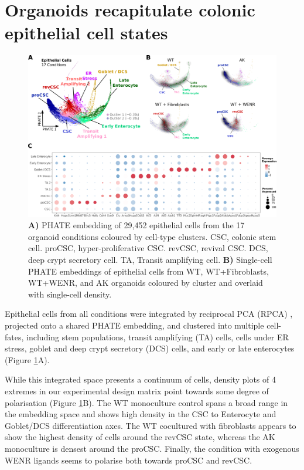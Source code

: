 \section{Organoids recapitulate colonic epithelial cell states}

\begin{figure}[H]
    \centering
    \includegraphics{04seq/figs/4SEQ_INTctrl.png}
    \caption{\textbf{A)} PHATE embedding of 29,452 epithelial cells from the 17 organoid conditions coloured by cell-type clusters. CSC, colonic stem cell. proCSC, hyper-proliferative CSC. revCSC, revival CSC. DCS, deep crypt secretory cell. TA, Transit amplifying cell. \textbf{B)} Single-cell PHATE embeddings of epithelial cells from WT, WT+Fibroblasts, WT+WENR, and AK organoids coloured by cluster and overlaid with single-cell density.}
    \label{fig:4intepi}
\end{figure}

Epithelial cells from all conditions were integrated by reciprocal PCA (RPCA) \cite{hao_integrated_2021}, projected onto a shared PHATE embedding, and clustered into multiple cell-fates, including stem populations, transit amplifying (TA) cells, cells under ER stress, goblet and deep crypt secretory (DCS) cells, and early or late enterocytes (Figure \ref{fig:4intepi}A). 

While this integrated space presents a continuum of cells, density plots of 4 extremes in our experimental design matrix point towards some degree of polarisation (Figure \ref{fig:4intepi}B). The WT monoculture control spans a broad range in the embedding space and shows high density in the CSC to Enterocyte and Goblet/DCS differentiation axes. The WT cocultured with fibroblasts appears to show the highest density of cells around the revCSC state, whereas the AK monoculture is densest around the proCSC. Finally, the condition with exogenous WENR ligands seems to polarise both towards proCSC and revCSC.

